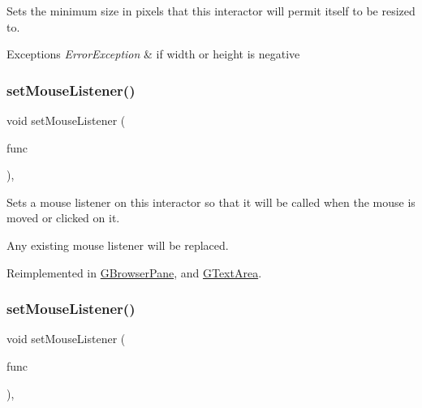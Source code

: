 Sets the minimum size in pixels that this interactor will permit itself to be resized to. 


\begin{DoxyExceptions}{Exceptions}
{\em Error\+Exception} & if width or height is negative \\
\hline
\end{DoxyExceptions}
\mbox{\label{classsgl_1_1GInteractor_a37d8dbc943f59920f705b0104f60bde2}} 
\subsubsection{\texorpdfstring{set\+Mouse\+Listener()}{setMouseListener()}\hspace{0.1cm}{\footnotesize\ttfamily [1/2]}}
{\footnotesize\ttfamily void set\+Mouse\+Listener (\begin{DoxyParamCaption}\item[{\mbox{\hyperlink{namespacesgl_ae9f3e9eab70035da1a2b114e21357b25}{G\+Event\+Listener}}}]{func }\end{DoxyParamCaption})\hspace{0.3cm}{\ttfamily [virtual]}, {\ttfamily [inherited]}}



Sets a mouse listener on this interactor so that it will be called when the mouse is moved or clicked on it. 

Any existing mouse listener will be replaced. 

Reimplemented in \mbox{\hyperlink{classsgl_1_1GBrowserPane_a2c6a3746da7ffa3819294896d4423059}{G\+Browser\+Pane}}, and \mbox{\hyperlink{classsgl_1_1GTextArea_a2c6a3746da7ffa3819294896d4423059}{G\+Text\+Area}}.

\mbox{\label{classsgl_1_1GInteractor_aea7f647ea62d59f71b5fad6aa65eeaf9}} 
\subsubsection{\texorpdfstring{set\+Mouse\+Listener()}{setMouseListener()}\hspace{0.1cm}{\footnotesize\ttfamily [2/2]}}
{\footnotesize\ttfamily void set\+Mouse\+Listener (\begin{DoxyParamCaption}\item[{\mbox{\hyperlink{namespacesgl_a54427ce97bb1c2804e4fe2b0a62e8b17}{G\+Event\+Listener\+Void}}}]{func }\end{DoxyParamCaption})\hspace{0.3cm}{\ttfamily [virtual]}, {\ttfamily [inherited]}}



